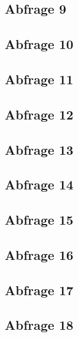 \subsection*{Abfrage 9}

\subsection*{Abfrage 10}

\subsection*{Abfrage 11}

\subsection*{Abfrage 12}

\subsection*{Abfrage 13}

\subsection*{Abfrage 14}

\subsection*{Abfrage 15}

\subsection*{Abfrage 16}

\subsection*{Abfrage 17}

\subsection*{Abfrage 18}

